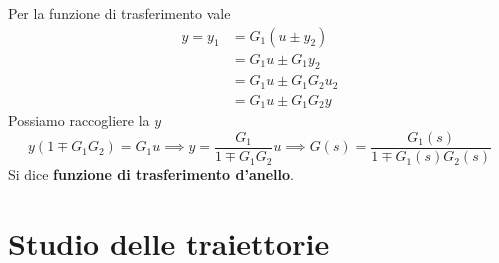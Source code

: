 Per la funzione di trasferimento vale
\begin{equation*}
	\begin{aligned}
		y=y_1 & =G_1\left(u\pm y_2\right) \\
		      & =G_1 u\pm G_1 y_2         \\
		      & =G_1 u\pm G_1 G_2 u_2     \\
		      & =G_1 u\pm G_1 G_2 y       
	\end{aligned}
\end{equation*}
Possiamo raccogliere la $y$
\begin{equation*}
	y\left(1\mp G_1 G_2\right) =G_1 u\implies y=\frac{G_1}{1\mp G_1 G_2} u\implies \boxed{G\left(s\right) =\frac{G_1\left(s\right)}{1\mp G_1\left(s\right) G_2\left(s\right)}}
\end{equation*}
Si dice \textbf{funzione di trasferimento d'anello}.

\chapter{Studio delle traiettorie}

